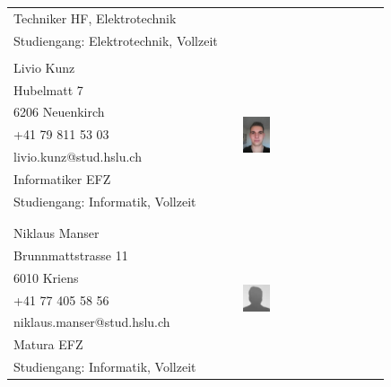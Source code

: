 \begin{tabular}{lp{3.3cm}l}
    Techniker HF, Elektrotechnik                & &  \\
    Studiengang: Elektrotechnik, Vollzeit       & &  \\
                                                & &  \\
    Livio Kunz                                  & &  \multirow{8}{4cm}{\includegraphics[width=0.2\textwidth]{DasTeam/Bilder/LivioKunz.jpg}} \\
    Hubelmatt 7                                 & &  \\
    6206 Neuenkirch                             & &  \\
    +41 79 811 53 03                            & &  \\
    livio.kunz@stud.hslu.ch                     & &  \\
    Informatiker EFZ                            & &  \\
    Studiengang: Informatik, Vollzeit 			& &  \\
                                                & &  \\
                                                & &  \\
    Niklaus Manser                              & &  \multirow{8}{4cm}{\includegraphics[width=0.2\textwidth]{DasTeam/Bilder/NiklausManser.jpg}} \\
    Brunnmattstrasse 11                         & &  \\
    6010 Kriens                                 & &  \\
    +41 77 405 58 56                            & &  \\
    niklaus.manser@stud.hslu.ch                 & &  \\
    Matura EFZ                    			    & &  \\
    Studiengang: Informatik, Vollzeit           & &  \\

\end{tabular}
